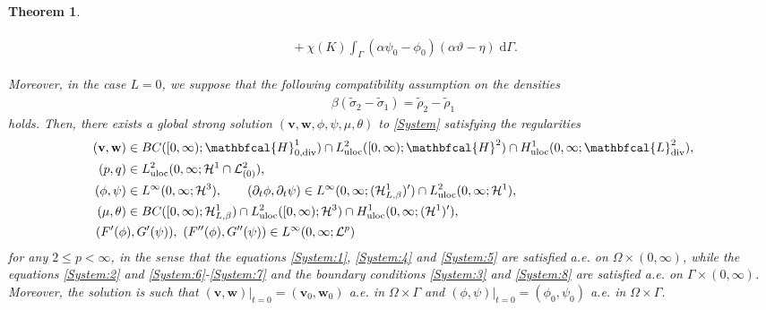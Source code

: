 \documentclass[10pt,reqno]{amsart}
\newtheorem{theorem}{Theorem}[section]
\theoremstyle{remark}
\numberwithin{equation}{section}
\newcommand{\bv}{\mathbf{v}}
\newcommand{\bw}{\mathbf{w}}
\newcommand{\intG}{\int_\Gamma}
\newcommand{\dG}{\;\mathrm d\Ga}
\newcommand{\delt}{\partial_{t}}
\newcommand{\Div}{\textnormal{div}}
\newcommand{\Om}{\Omega}
\newcommand{\Ga}{\Gamma}
\begin{document}
\begin{theorem}
\begin{enumerate}[label=\textnormal{\bfseries(C)},topsep=0ex,leftmargin=*]
\begin{align*}
\begin{aligned}
            &\quad + \chi(K)\intG(\alpha\psi_0 - \phi_0)(\alpha\vartheta - \eta)\dG.
        \end{aligned}
        \end{align*}
    \end{enumerate}
    Moreover, in the case $L = 0$, we suppose that the following compatibility assumption on the densities
    \begin{align}\label{Densities:Comp:Strong}
        \beta(\tilde\sigma_2 - \tilde\sigma_1) = \tilde\rho_2 - \tilde\rho_1
    \end{align}
    holds.
    Then, there exists a global strong solution $(\bv,\bw,\phi,\psi,\mu,\theta)$ to \eqref{System} satisfying the regularities
    \begin{align}
        (\bv,\bw)&\in BC([0,\infty);\mathbfcal{H}^1_{0,\Div})\cap L^2_{\mathrm{uloc}}([0,\infty);\mathbfcal{H}^2)\cap H^1_{\mathrm{uloc}}(0,\infty;\mathbfcal{L}^2_\Div), \\
        (p,q)&\in L^2_{\mathrm{uloc}}(0,\infty;\mathcal{H}^1\cap\mathcal{L}^2_{(0)}), \\
        (\phi,\psi)&\in L^\infty(0,\infty;\mathcal{H}^3), \qquad (\delt\phi,\delt\psi)\in L^\infty(0,\infty;(\mathcal{H}^1_{L,\beta})^\prime) \cap L^2_{\mathrm{uloc}}(0,\infty;\mathcal{H}^1), \\
        (\mu,\theta)&\in BC([0,\infty);\mathcal{H}^1_{L,\beta})\cap L^2_{\mathrm{uloc}}([0,\infty);\mathcal{H}^3)\cap H^1_{\mathrm{uloc}}(0,\infty;(\mathcal{H}^1)^\prime), \\
        (F^\prime(\phi&), G^\prime(\psi)), \ (F^{\prime\prime}(\phi), G^{\prime\prime}(\psi))\in L^\infty(0,\infty;\mathcal{L}^p)
    \end{align}
    for any $2 \leq p < \infty$, in the sense that the equations \eqref{System:1}, \eqref{System:4} and \eqref{System:5} are satisfied a.e. on $\Om\times(0,\infty)$, while the equations \eqref{System:2} and \eqref{System:6}-\eqref{System:7} and the boundary conditions \eqref{System:3} and \eqref{System:8} are satisfied a.e. on $\Ga\times(0,\infty)$. Moreover, the solution is such that $(\bv,\bw)\vert_{t=0} = (\bv_0,\bw_0)$ a.e. in $\Om\times\Ga$ and $(\phi,\psi)\vert_{t=0} = (\phi_0,\psi_0)$ a.e. in $\Om\times\Ga$.
\end{theorem}
\end{document}
